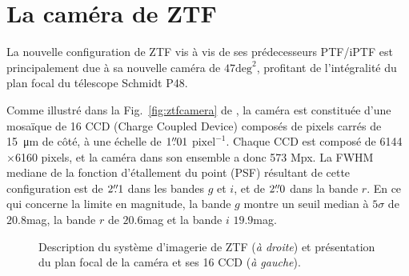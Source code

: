 \documentclass[../main/main.tex]{subfiles}
\begin{document}
\section{La caméra de ZTF}
\label{sec:ztfcamera}

La nouvelle configuration de ZTF vis à vis de ses prédecesseurs PTF/iPTF
est principalement due à sa nouvelle caméra de $47\text{deg}^{2}$, profitant de
l'intégralité du plan focal du télescope Schmidt P48.

Comme illustré dans la Fig.~\ref{fig:ztfcamera} de \citet{BellmZTF2019}, la caméra est
constituée d'une mosaïque de 16 CCD (Charge Coupled Device) composés de
pixels carrés de \SI{15}{\micro\metre} de côté, à une échelle de $1\overset{\prime\prime}{.}01$
$\text{pixel}^{-1}$. Chaque CCD est composé de 6144$\times$6160 pixels,
et la caméra dans son ensemble a donc 573 Mpx. La FWHM mediane de la fonction d'étallement du point
(PSF) résultant de cette configuration est de $2\overset{\prime\prime}{.}1$ dans les bandes
$g$ et $i$, et de $2\overset{\prime\prime}{.}0$ dans la bande $r$. En ce qui concerne la limite en magnitude, la bande $g$ montre un seuil median à
$5\sigma$ de $20.8$mag, la bande $r$ de $20.6$mag et la bande $i$
$19.9$mag. 


\begin{figure}[ht]
\centering
{}\hfill
{}
\caption[Système d'imagerie ZTF et caméra]{Description du système d'imagerie de ZTF (\textit{à droite}) et présentation du
  plan focal de la caméra et ses 16 CCD (\textit{à gauche}). }
\label{fig:imageriecamztf}
\end{figure}
\end{document}

